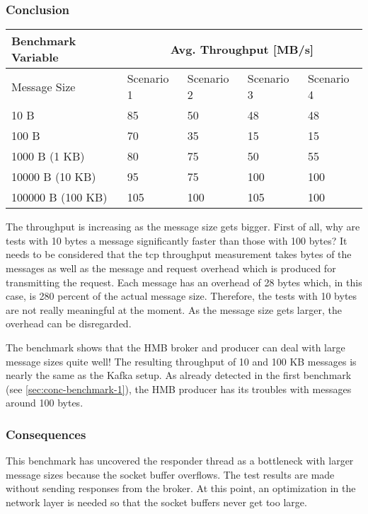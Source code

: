 \newpage
\subsubsection{Conclusion}
\begin{table}[H]
\centering
\begin{tabular}{|l|l|l|l|l|}
\hline
{\bf Benchmark Variable} & \multicolumn{4}{c|}{{\bf Avg. Throughput {[}MB/s{]}}} \\ \hline
Message Size             & Scenario 1       & Scenario 2       & Scenario 3     & Scenario 4 \\ \hline
10 B                     & 85               & 50               & 48             & 48         \\ \hline
100 B                    & 70               & 35               & 15             & 15         \\ \hline
1000 B (1 KB)            & 80               & 75               & 50             & 55         \\ \hline
10000 B (10 KB)          & 95               & 75               & 100            & 100         \\ \hline
100000 B (100 KB)        & 105              & 100              & 105            & 100         \\ \hline
\end{tabular}
\end{table}

The throughput is increasing as the message size gets bigger. First of
all, why are tests with 10 bytes a message significantly faster than those with
100 bytes? It needs to be considered that the tcp throughput measurement takes
bytes of the messages as well as the message and request overhead which is
produced for transmitting the request. Each message has an overhead of 28 bytes
which, in this case, is 280 percent of the actual message size. Therefore, the
tests with 10 bytes are not really meaningful at the moment. As the message
size gets larger, the overhead can be disregarded.

The benchmark shows that the HMB broker and producer can deal with large
message sizes quite well! The resulting throughput of 10 and 100 KB messages
is nearly the same as the Kafka setup. As already detected in the first benchmark
(see \ref{sec:conc-benchmark-1}), the HMB producer has its troubles with messages
around 100 bytes.

\subsubsection{Consequences}
This benchmark has uncovered the responder thread as a bottleneck with larger
message sizes because the socket buffer overflows. The test results are
made without sending responses from the broker. At this point, an optimization
in the network layer is needed so that the socket buffers never get too large.

